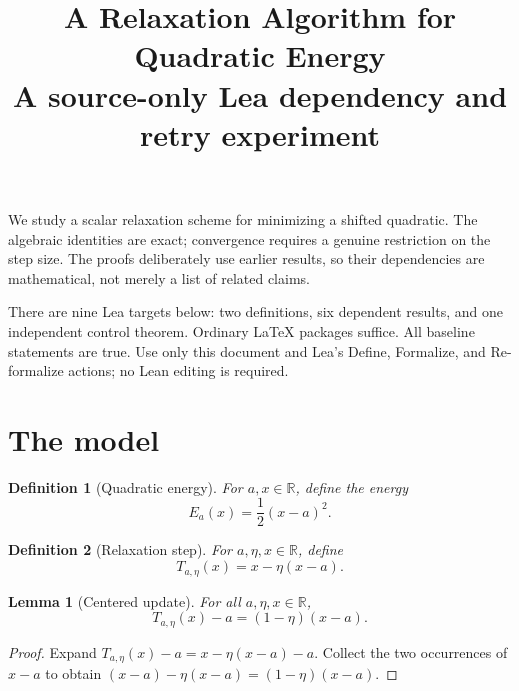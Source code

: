 \documentclass[11pt]{article}
\title{A Relaxation Algorithm for Quadratic Energy\\
\large A source-only Lea dependency and retry experiment}
\author{}
\date{}
\newtheorem{definition}{Definition}
\newtheorem{lemma}{Lemma}
\newcommand{\R}{\mathbb{R}}
\begin{document}
\maketitle

We study a scalar relaxation scheme for minimizing a shifted quadratic.
The algebraic identities are exact; convergence requires a genuine
restriction on the step size. The proofs deliberately use earlier results,
so their dependencies are mathematical, not merely a list of related claims.

There are nine Lea targets below: two definitions, six dependent results,
and one independent control theorem. Ordinary LaTeX packages suffice.
All baseline statements are true. Use only this document and Lea's
Define, Formalize, and Re-formalize actions; no Lean editing is required.

\section{The model}

\begin{definition}[Quadratic energy]\label{def:descent-energy}
For $a,x\in\R$, define the energy
\[
  E_a(x)=\frac12(x-a)^2.
\]
\end{definition}

\begin{definition}[Relaxation step]\label{def:descent-step}
For $a,\eta,x\in\R$, define
\[
  T_{a,\eta}(x)=x-\eta(x-a).
\]
\end{definition}

\begin{lemma}[Centered update]\label{lem:descent-error}
For all $a,\eta,x\in\R$,
\[
  T_{a,\eta}(x)-a=(1-\eta)(x-a).
\]
\end{lemma}
\begin{proof}
Expand $T_{a,\eta}(x)-a=x-\eta(x-a)-a$.
Collect the two occurrences of $x-a$ to obtain
$(x-a)-\eta(x-a)=(1-\eta)(x-a)$.
\end{proof}
\end{document}
